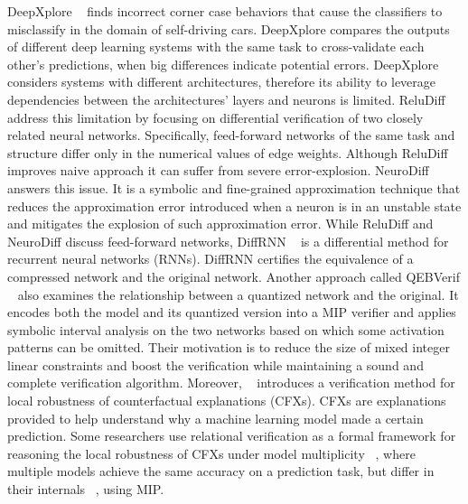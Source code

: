 DeepXplore ~\cite{DEEPXPLORE} finds incorrect corner case behaviors that cause the classifiers to misclassify in the domain of self-driving cars. DeepXplore compares the outputs of different deep learning systems with the same task to cross-validate each other’s predictions, when big differences indicate potential errors. DeepXplore considers systems with different architectures, therefore its ability to leverage dependencies between the architectures' layers and neurons is limited. ReluDiff ~\cite{RELUDIFF} address this limitation by focusing on differential verification of two closely related neural networks. Specifically, feed-forward networks of the same task and structure differ only in the numerical values of edge weights. Although ReluDiff improves naive approach it can suffer from severe error-explosion. NeuroDiff ~\cite{NEURODIFF} answers this issue. It is a symbolic and fine-grained approximation technique that reduces the approximation error introduced when a neuron is in an unstable state and mitigates the explosion of such approximation error. While ReluDiff and NeuroDiff discuss feed-forward networks, DiffRNN ~\cite{DIFFRNN} is a differential method for recurrent neural networks (RNNs). DiffRNN certifies the equivalence of a compressed network and the original network. Another approach called QEBVerif ~\cite{QEBVERIF} also examines the relationship between a quantized network and the original. It encodes both the model and its quantized version into a MIP verifier and applies symbolic interval analysis on the two networks based on which some activation patterns can be omitted. Their motivation is to reduce the size of mixed integer linear constraints and boost the verification while maintaining a sound and complete verification algorithm. Moreover, ~\cite{CFXROBUSTNESS} introduces a verification method for local robustness of counterfactual explanations (CFXs). CFXs are explanations provided to help understand why a machine learning model made a certain prediction. Some researchers use relational verification as a formal framework for reasoning the local robustness of CFXs under model multiplicity  ~\cite{CFXROBUSTNESS}, where multiple models achieve the same accuracy on a prediction task, but differ in their internals ~\cite{PREDICTIVEMULTIPICITY}, using MIP.

